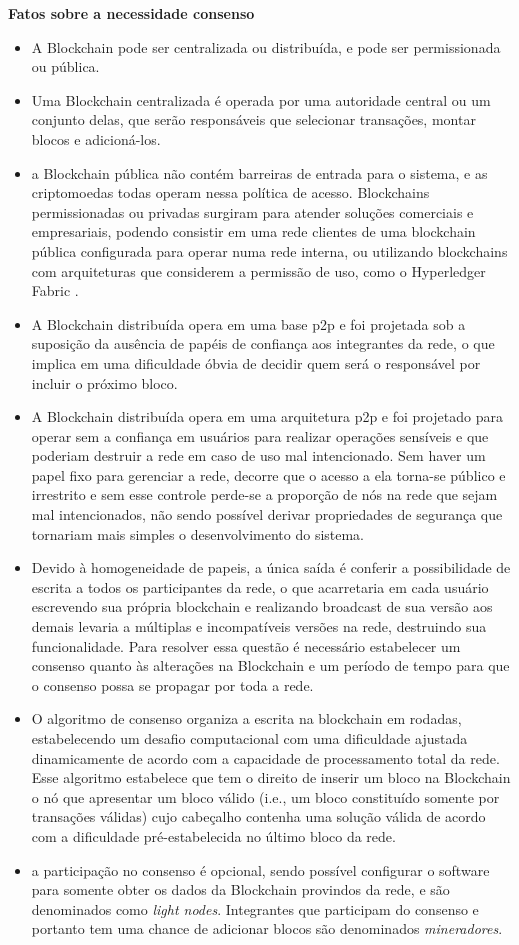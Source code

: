 \documentclass[a4paper,11pt]{article}
\begin{document}
\textbf{Fatos sobre a necessidade consenso}

\begin{itemize}
    \item A Blockchain pode ser centralizada ou distribuída, e pode ser permissionada ou pública.
    \item Uma Blockchain centralizada é operada por uma autoridade central ou um conjunto delas, que serão responsáveis que selecionar transações, montar blocos e adicioná-los.
    \item a Blockchain pública não contém barreiras de entrada para o sistema, e as criptomoedas todas operam nessa política de acesso. Blockchains permissionadas ou privadas surgiram para atender soluções comerciais e empresariais, podendo consistir em uma rede clientes de uma blockchain pública configurada para operar numa rede interna, ou utilizando blockchains com arquiteturas que considerem a permissão de uso, como o Hyperledger Fabric \cite{Indeterminado2019}.
    \item A Blockchain distribuída opera em uma base p2p e foi projetada sob a suposição da ausência de papéis de confiança aos integrantes da rede, o que implica em uma dificuldade óbvia de decidir quem será o responsável por incluir o próximo bloco.
    \item A Blockchain distribuída opera em uma arquitetura p2p e foi projetado para operar sem a confiança em usuários para realizar operações sensíveis e que poderiam destruir a rede em caso de uso mal intencionado. Sem haver um papel fixo para gerenciar a rede, decorre que o acesso a ela torna-se público e irrestrito e sem esse controle perde-se a proporção de nós na rede que sejam mal intencionados, não sendo possível derivar propriedades de segurança que tornariam mais simples o desenvolvimento do sistema.
    \item Devido à homogeneidade de papeis, a única saída é conferir a possibilidade de escrita a todos os participantes da rede, o que acarretaria em cada usuário escrevendo sua própria blockchain e realizando broadcast de sua versão aos demais levaria a múltiplas e incompatíveis versões na rede, destruindo sua funcionalidade. Para resolver essa questão é necessário estabelecer um consenso quanto às alterações na Blockchain e um período de tempo para que o consenso possa se propagar por toda a rede.
    \item O algoritmo de consenso organiza a escrita na blockchain em rodadas, estabelecendo um desafio computacional com uma dificuldade ajustada dinamicamente de acordo com a capacidade de processamento total da rede. Esse algoritmo estabelece que tem o direito de inserir um bloco na Blockchain o nó que apresentar um bloco válido (i.e., um bloco constituído somente por transações válidas) cujo cabeçalho contenha uma solução válida de acordo com a dificuldade pré-estabelecida no último bloco da rede.
    \item a participação no consenso é opcional, sendo possível configurar o software para somente obter os dados da Blockchain provindos da rede, e são denominados como \emph{light nodes}. Integrantes que participam do consenso e portanto tem uma chance de adicionar blocos são denominados \emph{mineradores}.
\end{itemize}
\end{document}
